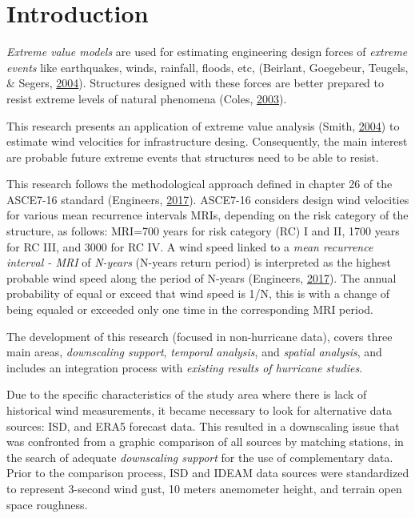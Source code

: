 \documentclass[12pt,oneside]{reedthesis}
\begin{document}
\hypertarget{introduction}{%
\chapter{Introduction}\label{introduction}}

\emph{Extreme value models} are used for estimating engineering design forces of \emph{extreme events} like earthquakes, winds, rainfall, floods, etc, (Beirlant, Goegebeur, Teugels, \& Segers, \protect\hyperlink{ref-Beirlant2004}{2004}). Structures designed with these forces are better prepared to resist extreme levels of natural phenomena (Coles, \protect\hyperlink{ref-Coles2003}{2003}).

This research presents an application of extreme value analysis (Smith, \protect\hyperlink{ref-Smith2004}{2004}) to estimate wind velocities for infrastructure desing. Consequently, the main interest are probable future extreme events that structures need to be able to resist.

This research follows the methodological approach defined in chapter 26 of the ASCE7-16 standard (Engineers, \protect\hyperlink{ref-Asce2017}{2017}). ASCE7-16 considers design wind velocities for various mean recurrence intervals MRIs, depending on the risk category of the structure, as follows: MRI=700 years for risk category (RC) I and II, 1700 years for RC III, and 3000 for RC IV. A wind speed linked to a \emph{mean recurrence interval - MRI} of \emph{N-years} (N-years return period) is interpreted as the highest probable wind speed along the period of N-years (Engineers, \protect\hyperlink{ref-Asce2017}{2017}). The annual probability of equal or exceed that wind speed is 1/N, this is with a change of being equaled or exceeded only one time in the corresponding MRI period.

The development of this research (focused in non-hurricane data), covers three main areas, \emph{downscaling support}, \emph{temporal analysis}, and \emph{spatial analysis}, and includes an integration process with \emph{existing results of hurricane studies}.

Due to the specific characteristics of the study area where there is lack of historical wind measurements, it became necessary to look for alternative data sources: ISD, and ERA5 forecast data. This resulted in a downscaling issue that was confronted from a graphic comparison of all sources by matching stations, in the search of adequate \emph{downscaling support} for the use of complementary data. Prior to the comparison process, ISD and IDEAM data sources were standardized to represent 3-second wind gust, 10 meters anemometer height, and terrain open space roughness.
\end{document}
